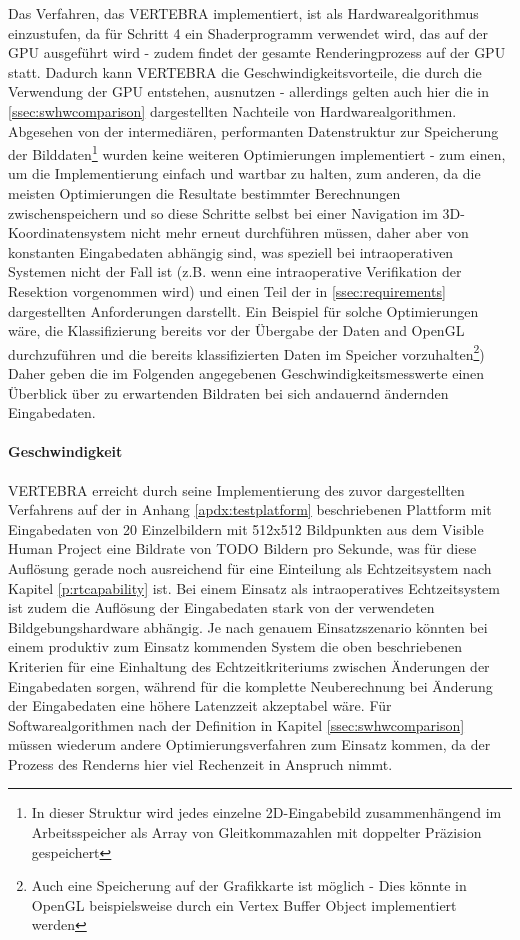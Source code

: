 \documentclass[pdftex,a4paper,titlepage,12pt]{scrartcl}
\newtheorem[L]{boxedDefinition}{Definition}
\begin{document}
Das Verfahren, das VERTEBRA implementiert, ist als Hardwarealgorithmus einzustufen, da für Schritt 4 ein Shaderprogramm verwendet wird, das auf der GPU ausgeführt wird - zudem findet der gesamte Renderingprozess auf der GPU statt. Dadurch kann VERTEBRA die Geschwindigkeitsvorteile, die durch die Verwendung der GPU entstehen, ausnutzen - allerdings gelten auch hier die in \vref{ssec:swhwcomparison} dargestellten Nachteile von Hardwarealgorithmen. Abgesehen von der intermediären, performanten Datenstruktur zur Speicherung der Bilddaten\footnote{In dieser Struktur wird jedes einzelne 2D-Eingabebild zusammenhängend im Arbeitsspeicher als Array von Gleitkommazahlen mit doppelter Präzision gespeichert} wurden keine weiteren Optimierungen implementiert - zum einen, um die Implementierung einfach und wartbar zu halten, zum anderen, da die meisten Optimierungen die Resultate bestimmter Berechnungen zwischenspeichern und so diese Schritte selbst bei einer Navigation im 3D-Koordinatensystem nicht mehr erneut durchführen müssen, daher aber von konstanten Eingabedaten abhängig sind, was speziell bei intraoperativen Systemen nicht der Fall ist (z.B. wenn eine intraoperative Verifikation der Resektion vorgenommen wird) und einen Teil der in \vref{ssec:requirements} dargestellten Anforderungen darstellt. Ein Beispiel für solche Optimierungen wäre, die Klassifizierung bereits vor der Übergabe der Daten and OpenGL durchzuführen und die bereits klassifizierten Daten im Speicher vorzuhalten\footnote{Auch eine Speicherung auf der Grafikkarte ist möglich - Dies könnte in OpenGL beispielsweise durch ein Vertex Buffer Object implementiert werden}) Daher geben die im Folgenden angegebenen Geschwindigkeitsmesswerte einen Überblick über zu erwartenden Bildraten bei sich andauernd ändernden Eingabedaten.

\paragraph{Geschwindigkeit}
VERTEBRA erreicht durch seine Implementierung des zuvor dargestellten Verfahrens auf der in Anhang \vref{apdx:testplatform} beschriebenen Plattform mit Eingabedaten von 20 Einzelbildern mit 512x512 Bildpunkten aus dem Visible Human Project eine Bildrate von TODO Bildern pro Sekunde, was für diese Auflösung gerade noch ausreichend für eine Einteilung als Echtzeitsystem nach Kapitel \vref{p:rtcapability} ist. Bei einem Einsatz als intraoperatives Echtzeitsystem ist zudem die Auflösung der Eingabedaten stark von der verwendeten Bildgebungshardware abhängig. Je nach genauem Einsatzszenario könnten bei einem produktiv zum Einsatz kommenden System die oben beschriebenen Kriterien für eine Einhaltung des Echtzeitkriteriums zwischen Änderungen der Eingabedaten sorgen, während für die komplette Neuberechnung bei Änderung der Eingabedaten eine höhere Latenzzeit akzeptabel wäre. Für Softwarealgorithmen nach der Definition in Kapitel \ref{ssec:swhwcomparison} müssen wiederum andere Optimierungsverfahren zum Einsatz kommen, da der Prozess des Renderns hier viel Rechenzeit in Anspruch nimmt.
\end{document}
